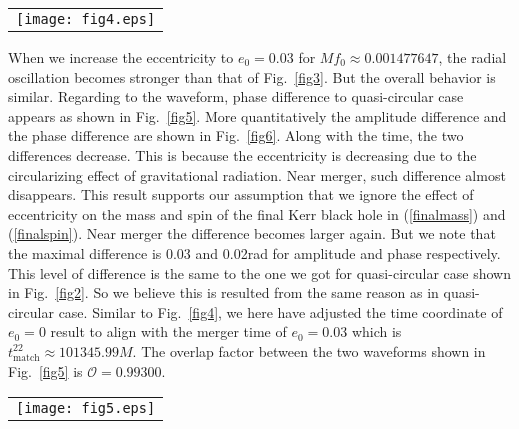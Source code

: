 \documentclass[prd,aps,a4paper,superscriptaddress,twocolumn,footinbib,showpacs]{revtex4}
\begin{document}
\begin{figure*}
\begin{tabular}{c}
\texttt{[image: fig4.eps]}
\end{tabular}
\caption{Similar to Fig.~\ref{fig1} but for two identical spinless black holes with eccentricity  $e_0=0.003$ at $Mf_0\approx0.0015$. The result of $e_0=0$ is got through SEOBNRv1 code, and the $e_0=0.003$ result is got by SEOBNRE model.}\label{fig4}
\end{figure*}

When we increase the eccentricity to $e_0=0.03$ for $Mf_0\approx0.001477647$, the radial oscillation becomes stronger than that of Fig.~\ref{fig3}. But the overall behavior is similar. Regarding to the waveform, phase difference to quasi-circular case appears as shown in Fig.~\ref{fig5}. More quantitatively the amplitude difference and the phase difference are shown in Fig.~\ref{fig6}. Along with the time, the two differences decrease. This is because the eccentricity is decreasing due to the circularizing effect of gravitational radiation. Near merger, such difference almost disappears. This result supports our assumption that we ignore the effect of eccentricity on the mass and spin of the final Kerr black hole in (\ref{finalmass}) and (\ref{finalspin}). Near merger the difference becomes larger again. But we note that the maximal difference is 0.03 and 0.02rad for amplitude and phase respectively. This level of difference is the same to the one we got for quasi-circular case shown in Fig.~\ref{fig2}. So we believe this is resulted from the same reason as in quasi-circular case. Similar to Fig.~\ref{fig4}, we here have adjusted the time coordinate of $e_0=0$ result to align with the merger time of $e_0=0.03$ which is $t^{22}_{\text{match}}\approx101345.99M$. The overlap factor between the two waveforms shown in Fig.~\ref{fig5} is $\mathcal{O}=0.99300$.

\begin{figure*}
\begin{tabular}{c}
\texttt{[image: fig5.eps]}
\end{tabular}
\caption{Similar to Fig.~\ref{fig1} but for two identical spinless black holes with eccentricity  $e_0=0.03$ at $Mf_0\approx0.0015$. The result of $e_0=0$ is got through SEOBNRv1 code, and the $e_0=0.03$ result is got by SEOBNRE model.}\label{fig5}
\end{figure*}
\end{document}
